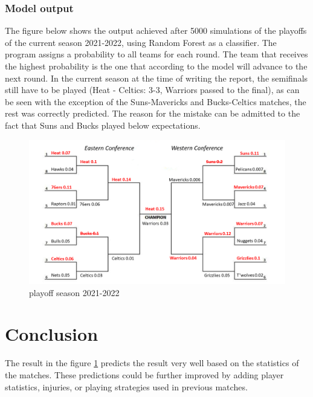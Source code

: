 \documentclass{article}
\begin{document}
\subsubsection{Model output}
The figure below shows the output achieved after 5000 simulations of the playoffs of the current season 2021-2022, using Random Forest as a classifier. The program assigns a probability to all teams for each round. The team that receives the highest probability is the one that according to the model will advance to the next round. In the current season at the time of writing the report, the semifinals still have to be played (Heat - Celtics: 3-3, Warriors passed to the final), as can be seen with the exception of the Suns-Mavericks and Bucks-Celtics matches, the rest was correctly predicted. The reason for the mistake can be admitted to the fact that Suns and Bucks played below expectations.
\begin{figure}[h]
    \centering
    \includegraphics[width=\textwidth]{../plot/playoffs.png}
    \caption{playoff season 2021-2022}
    \label{fig:playoffSeason2022}
\end{figure}
\section{Conclusion}
The result in the figure \ref{fig:playoffSeason2022} predicts the result very well based on the statistics of the matches. These predictions could be further improved by adding player statistics, injuries, or playing strategies used in previous matches. 
\end{document}

